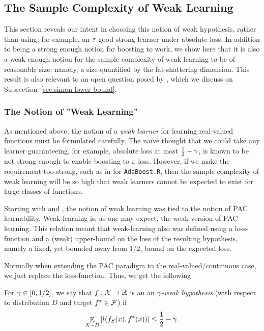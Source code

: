 \documentclass[12pt,a4paper,oneside,onecolumn]{book}
\begin{document}
\subsection{The Sample Complexity of Weak Learning}
\label{subsec:weak-learning}

This section reveals our intent in choosing this notion of weak hypothesis, 
rather than using, for example, an $\varepsilon$-good strong learner under absolute loss.
In addition to being a strong enough notion for boosting to work, 
we show here that it is also a weak enough notion for the sample complexity 
of weak learning to be of reasonable size: namely, a size quantified by the fat-shattering dimension.
This result is also relevant to an open question posed by
\citet{DBLP:journals/siamcomp/Simon97},
which we discuss on Subsection~\ref{sec:simon-lower-bound}.

    


\subsubsection{The Notion of "Weak Learning"}
\label{sec:notion-weak-learning}

As mentioned above, the notion of a \emph{weak learner} for learning real-valued functions must be formulated carefully.
The na\"{i}ve thought that we could take any learner guaranteeing, for example, absolute loss at most $\frac{1}{2}-\gamma$, 
is known to be not strong enough to enable boosting to $\varepsilon$ loss.  However, if we make the requirement too strong, 
such as in
\citet{FreundSchapire97}
for
{\tt AdaBoost.R},
then the sample complexity of weak learning will be so high that weak learners cannot 
be expected to exist for large classes of functions. 

Starting with \citeauthor{k-thb-88} and \citeauthor{DBLP:journals/ml/Schapire90}, 
the notion of weak learning was tied to the notion of
PAC learnability.
Weak learning is, as one may expect,
the weak version of PAC learning.
This relation meant that weak-learning also
was defined using a loss-function
and a (weak) upper-bound on
the loss of the resulting hypothesis,
namely a fixed, yet bounded away from $1/2$,
bound on the expected loss.

Normally when extending the PAC paradigm
to the real-valued/continuous case,
we just replace the loss-function.
Thus, we get the following
\begin{definition}
  For $\gamma \in [0,1/2]$,
  we say that $f:\mathcal{X}\to\mathbb{R}$ is an  
  an \emph{$\gamma$-weak hypothesis}
  (with respect to distribution $D$ and target $f^*\in\mathcal{F}$)
  if \[\mathop{\mathbb{E}}_{X\sim D} \left[ l(f_S (x), f^*(x)) \right] \leq \frac{1}{2} - \gamma.\]
\end{definition}
\end{document}
